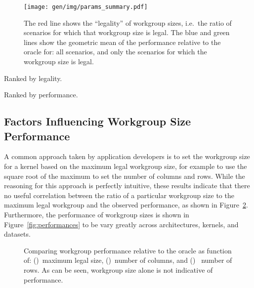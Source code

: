 
\begin{figure}
\centering
\texttt{[image: gen/img/params\_summary.pdf]}
\caption{%
  The red line shows the ``legality'' of workgroup sizes, i.e.\ the
  ratio of scenarios for which that workgroup size is legal.  The blue
  and green lines show the geometric mean of the performance relative
  to the oracle for: all scenarios, and only the scenarios for which
  the workgroup size is legal.%
}
\label{fig:performance-legality}
\end{figure}


\begin{table}
  \parbox{.45\linewidth}{
    \centering
    \scriptsize
    
    \caption{Ranked by legality.}
  }
  \hfill
  \parbox{.45\linewidth}{
    \centering
    \scriptsize
    
    \caption{Ranked by performance.}
  }
\end{table}


\subsection{Factors Influencing Workgroup Size Performance}

A common approach taken by application developers is to set the
workgroup size for a kernel based on the maximum legal workgroup size,
for example to use the square root of the maximum to set the number of
columns and rows. While the reasoning for this approach is perfectly
intuitive, these results indicate that there no useful correlation
between the ratio of a particular workgroup size to the maximum legal
workgroup and the observed performance, as shown in
Figure~\ref{fig:performance-wgsizes}. Furthermore, the performance of
workgroup sizes is shown in Figure~\ref{fig:performances} to be vary
greatly across architectures, kernels, and datasets.


\clearpage
\begin{figure}

\caption{%
  Comparing workgroup performance relative to the oracle as function
  of: ()~maximum legal size,
  ()~number of columns, and
  ()~ number of rows. As can be seen,
  workgroup size alone is not indicative of performance.%
}
\label{fig:performance-wgsizes}
\end{figure}

